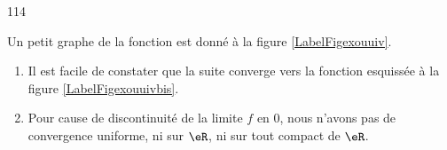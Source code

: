 

\begin{corrige}{114}

Un petit graphe de la fonction est donné à la figure \ref{LabelFigexouuiv}.
\newcommand{\CaptionFigexouuiv}{Une des fonctions $f_n$ proposées.}


\begin{enumerate}
\item Il est facile de constater que la suite converge vers la fonction esquissée à la figure \ref{LabelFigexouuivbis}.
\newcommand{\CaptionFigexouuivbis}{La limite de la suite de fonction de l'exercice \ref{corr114}.}


\item Pour cause de discontinuité de la limite $f$ en $0$, nous n'avons pas de convergence uniforme, ni sur $\eR$, ni sur tout compact de $\eR$.
\end{enumerate}
\end{corrige}
